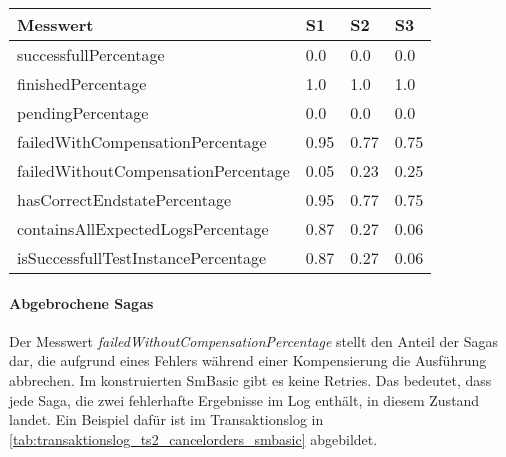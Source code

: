 \begin{center}
	\fontsize{9}{12}\selectfont
	\begin{longtable}[h]{|p{5cm}|p{1cm}|p{1cm}|p{1cm}|}
		\hline
		Messwert & S1 & S2 & S3 \\ \hline
		\endhead
		\endfoot
		successfull\-Percentage & 0.0 & 0.0 & 0.0 \\ \hline
		finished\-Percentage & 1.0 & 1.0 & 1.0 \\ \hline
		pending\-Percentage & 0.0 & 0.0 & 0.0 \\ \hline
		failedWithCompensation\-Percentage & 0.95 & 0.77 & 0.75 \\ \hline
		failedWithoutCompensation\-Percentage & 0.05 & 0.23 & 0.25 \\ \hline
		hasCorrectEndstate\-Percentage & 0.95 & 0.77 & 0.75 \\ \hline
		containsAllExpectedLogs\-Percentage & 0.87 & 0.27 & 0.06 \\ \hline
		isSuccessfullTestInstance\-Percentage & 0.87 & 0.27 & 0.06 \\ \hline
	\end{longtable}
\end{center}
\FloatBarrier

\paragraph*{Abgebrochene Sagas}
Der Messwert \textit{failedWithoutCompensationPercentage} stellt den Anteil der Sagas dar, die aufgrund eines Fehlers während einer Kompensierung die Ausführung abbrechen. Im konstruierten SmBasic gibt es keine Retries. Das bedeutet, dass jede Saga, die zwei fehlerhafte Ergebnisse im Log enthält, in diesem Zustand landet. Ein Beispiel dafür ist im Transaktionslog in \cref{tab:transaktionslog_ts2_cancelorders_smbasic} abgebildet. 

